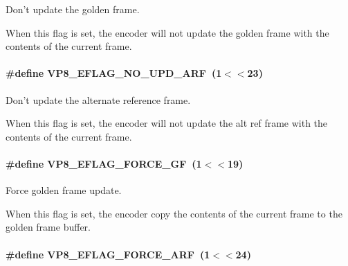 Don't update the golden frame. 

When this flag is set, the encoder will not update the golden frame with the contents of the current frame. \hypertarget{group__vp8__encoder_ga1cff46a5287e73a620660030d40b9e6c}{
\paragraph[{V\+P8\+\_\+\+E\+F\+L\+A\+G\+\_\+\+N\+O\+\_\+\+U\+P\+D\+\_\+\+A\+R\+F}]{\setlength{\rightskip}{0pt plus 5cm}\#define V\+P8\+\_\+\+E\+F\+L\+A\+G\+\_\+\+N\+O\+\_\+\+U\+P\+D\+\_\+\+A\+R\+F~(1$<$$<$23)}}\label{group__vp8__encoder_ga1cff46a5287e73a620660030d40b9e6c}


Don't update the alternate reference frame. 

When this flag is set, the encoder will not update the alt ref frame with the contents of the current frame. \hypertarget{group__vp8__encoder_gacb64c00adcb361f72a9a3028eb12f5ff}{
\paragraph[{V\+P8\+\_\+\+E\+F\+L\+A\+G\+\_\+\+F\+O\+R\+C\+E\+\_\+\+G\+F}]{\setlength{\rightskip}{0pt plus 5cm}\#define V\+P8\+\_\+\+E\+F\+L\+A\+G\+\_\+\+F\+O\+R\+C\+E\+\_\+\+G\+F~(1$<$$<$19)}}\label{group__vp8__encoder_gacb64c00adcb361f72a9a3028eb12f5ff}


Force golden frame update. 

When this flag is set, the encoder copy the contents of the current frame to the golden frame buffer. \hypertarget{group__vp8__encoder_ga50584fe4bdb62ff935347576539650b7}{
\paragraph[{V\+P8\+\_\+\+E\+F\+L\+A\+G\+\_\+\+F\+O\+R\+C\+E\+\_\+\+A\+R\+F}]{\setlength{\rightskip}{0pt plus 5cm}\#define V\+P8\+\_\+\+E\+F\+L\+A\+G\+\_\+\+F\+O\+R\+C\+E\+\_\+\+A\+R\+F~(1$<$$<$24)}}\label{group__vp8__encoder_ga50584fe4bdb62ff935347576539650b7}


